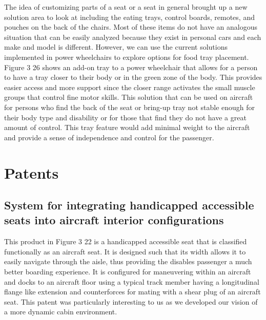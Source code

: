 \documentclass[a4paper, 12pt,conference]{new_cit_thesis}
\begin{document}
The idea of customizing parts of a seat or a seat in general brought up a new solution area to look at including the eating trays, control boards, remotes, and pouches on the back of the chairs. Most of these items do not have an analogous situation that can be easily analyzed because they exist in personal cars and each make and model is different. However, we can use the current solutions implemented in power wheelchairs to explore options for food tray placement.  Figure 3 26 shows an add-on tray to a power wheelchair that allows for a person to have a tray closer to their body or in the green zone of the body.  This provides easier access and more support since the closer range activates the small muscle groups that control fine motor skills.  This solution that can be used on aircraft for persons who find the back of the seat or bring-up tray not stable enough for their body type and disability or for those that find they do not have a great amount of control.  This tray feature would add minimal weight to the aircraft and provide a sense of independence and control for the passenger. 

\section*{Patents}
\subsection{System for integrating handicapped accessible seats into aircraft interior configurations}
This product in Figure 3 22 is a handicapped accessible seat that is classified functionally as an aircraft seat. It is designed such that its width allows it to easily navigate through the aisle, thus providing the disables passenger a much better boarding experience. It is configured for maneuvering within an aircraft and docks to an aircraft floor using a typical track member having a longitudinal flange like extension and counterforces for mating with a shear plug of an aircraft seat.  This patent was particularly interesting to us as we developed our vision of a more dynamic cabin environment.
\end{document}

